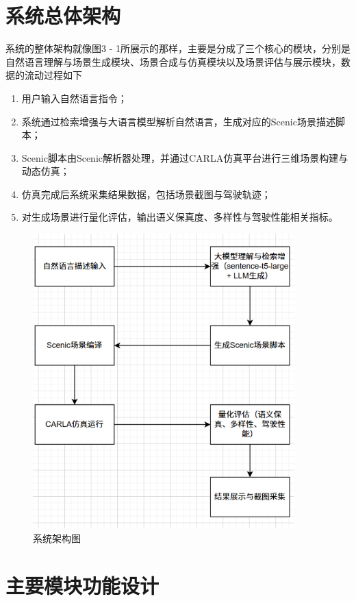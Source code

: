 \section{系统总体架构}
系统的整体架构就像图3 - 1所展示的那样，主要是分成了三个核心的模块，分别是自然语言理解与场景生成模块、场景合成与仿真模块以及场景评估与展示模块，数据的流动过程如下
\begin{enumerate}
	\item 用户输入自然语言指令；
	\item 系统通过检索增强与大语言模型解析自然语言，生成对应的Scenic场景描述脚本；
	\item Scenic脚本由Scenic解析器处理，并通过CARLA仿真平台进行三维场景构建与动态仿真；
	\item 仿真完成后系统采集结果数据，包括场景截图与驾驶轨迹；
	\item 对生成场景进行量化评估，输出语义保真度、多样性与驾驶性能相关指标。
\end{enumerate}
\begin{figure}[H]
	\centering
	\includegraphics[width=0.9\textwidth]{../images/系统架构图.pdf} 
	\caption{系统架构图}
	\label{fig:system_architecture} %
\end{figure}

\section{主要模块功能设计}
